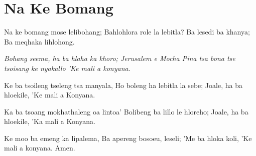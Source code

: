 \starttocol
\chapter{Na Ke Bomang}
\nexttocol
\hfill{\it }
\stoptocol
\starttocol
\startlines
{\sc Na} ke bomang mose lelibohang;
Bahlohlora role la lebitla?
Ba lesedi ba khanya;
Ba meqhaka lihlohong.

{\it Bohang seema, ha ba hlaha ka khoro;
Jerusalem e Mocha
Pina tsa bona tse tsoisang ke nyakallo
'Ke mali a konyana.}

Ke ba tsoileng tseleng tsa manyala, 
Ho boleng ha lebitla la sebe;
Joale, ha ba hloekile, 
'Ke mali a Konyana. 

Ka ba tsoang mokhathaleng oa lintoa'
Bolibeng ba lillo le hloreho;
Joale, ha ba hloekile,
'Ka mali a Konyana. 

Ke moo ba emeng ka lipalema,
Ba apereng bosoeu, leseli;
'Me ba hloka koli,
'Ke mali a konyana. 
          \hfill Amen.~~~~~~~~~

\stoplines
\nexttocol

\stoptocol
